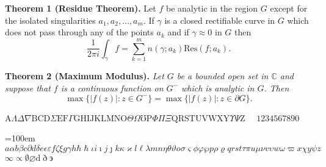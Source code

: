 \textbf{Theorem 1 (Residue Theorem).}
Let $f$ be analytic in the region $G$ except for the isolated singularities $a_1,a_2,\ldots,a_m$. If $\gamma$ is a closed rectifiable curve in $G$ which does not pass through any of the points $a_k$ and if $\gamma\approx 0$ in $G$ then
\[
\frac{1}{2\pi i}\int_\gamma f = \sum_{k=1}^m n(\gamma;a_k) \text{Res}(f;a_k).
\]

\textbf{Theorem 2 (Maximum Modulus).}
\emph{Let $G$ be a bounded open set in $\mathbb{C}$ and suppose that $f$ is a continuous function on $G^-$ which is analytic in $G$. Then}
\[
\max\{|f(z)|:z\in G^-\}=\max \{|f(z)|:z\in \partial G \}.
\]
\vspace*{-1em}

\newcommand{\abc}{abcdefghijklmnopqrstuvwxyz}
\newcommand{\ABC}{ABCDEFGHIJKLMNOPQRSTUVWXYZ}
\newcommand{\alphabeta}{\alpha\beta\gamma\delta\epsilon\varepsilon\zeta\eta\theta\vartheta\iota\kappa\varkappa\lambda\mu\nu\xi o\pi\varpi\rho\varrho\sigma\varsigma\tau\upsilon\phi\varphi\chi\psi\omega}
\newcommand{\AlphaBeta}{\Gamma\Delta\Theta\Lambda\Xi\Pi\Sigma\Upsilon\Phi\Psi\Omega}




$\mathrm{A} \Lambda \Delta \nabla \mathrm{B C D} \Sigma \mathrm{E F} \Gamma \mathrm{G H I J K L M N O} \Theta \Omega \mho \mathrm{P} \Phi \Pi \Xi \mathrm{Q R S T U V W X Y} \Upsilon \Psi \mathrm{Z} $  $ \quad 1234567890 $


{\par {} \emergencystretch=100em $a\alpha b \beta c \partial d \delta e \epsilon \varepsilon f \zeta \xi g \gamma h \hbar \hslash \iota i \imath j \jmath k \kappa \varkappa l \ell \lambda m n \eta \theta \vartheta o \sigma \varsigma \phi \varphi \wp p \rho \varrho q r s t \tau \pi u \mu \nu v \upsilon w \omega \varpi x \chi y \psi z$ \linebreak[3] $\infty \propto \emptyset \varnothing \mathrm{d}\eth \backepsilon$\par}


